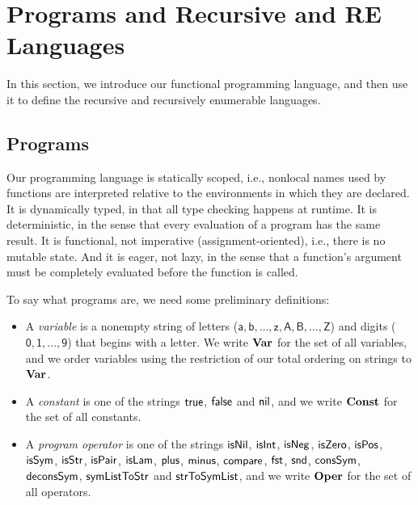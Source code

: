 \section{Programs and Recursive and RE Languages}
\label{ProgramsAndRecursiveAndRELanguages}

In this section, we introduce our functional programming language,
and then use it to define the recursive and recursively enumerable
languages.

\subsection{Programs}

Our programming language is statically scoped, i.e., nonlocal names
used by functions are interpreted relative to the environments in
which they are declared.  It is dynamically typed, in that all type
checking happens at runtime.  It is deterministic, in the sense that
every evaluation of a program has the same result.  It is functional,
not imperative (assignment-oriented), i.e., there is no mutable state.
And it is eager, not lazy, in the sense that a function's argument
must be completely evaluated before the function is called.

To say what programs are, we need some preliminary definitions:
\begin{itemize}
\item A \emph{variable} is a nonempty string of letters
  ($\mathsf{a,b,\ldots,z,A,B,\ldots,Z}$) and digits
  ($\mathsf{0,1,\ldots,9}$) that begins with a letter.  We write
  $\mathbf{Var}$ for the set of all variables, and we order variables
  using the restriction of our total ordering on strings to
  $\mathbf{Var}$.

\item A \emph{constant} is one of the strings $\mathsf{true}$, $\mathsf{false}$ and
  $\mathsf{nil}$, and we write $\mathbf{Const}$ for the set of all constants.

\item A \emph{program operator} is one of the strings
  $\mathsf{isNil}$, $\mathsf{isInt}$, $\mathsf{isNeg}$, $\mathsf{isZero}$,
  $\mathsf{isPos}$, $\mathsf{isSym}$, $\mathsf{isStr}$, $\mathsf{isPair}$,
  $\mathsf{isLam}$, $\mathsf{plus}$, $\mathsf{minus}$, $\mathsf{compare}$, $\mathsf{fst}$,
  $\mathsf{snd}$, $\mathsf{consSym}$, $\mathsf{deconsSym}$, $\mathsf{symListToStr}$ and
  $\mathsf{strToSymList}$, and we write $\mathbf{Oper}$ for the set of
  all operators.
\end{itemize}

